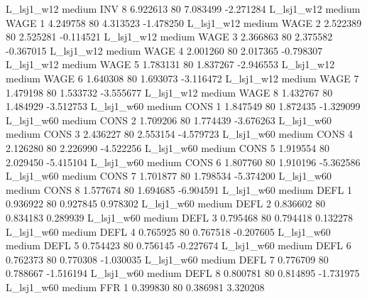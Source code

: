     L_lsj1_w12     medium      INV                 8  6.922613 80       7.083499          -2.271284
    L_lsj1_w12     medium     WAGE                 1  4.249758 80       4.313523          -1.478250
    L_lsj1_w12     medium     WAGE                 2  2.522389 80       2.525281          -0.114521
    L_lsj1_w12     medium     WAGE                 3  2.366863 80       2.375582          -0.367015
    L_lsj1_w12     medium     WAGE                 4  2.001260 80       2.017365          -0.798307
    L_lsj1_w12     medium     WAGE                 5  1.783131 80       1.837267          -2.946553
    L_lsj1_w12     medium     WAGE                 6  1.640308 80       1.693073          -3.116472
    L_lsj1_w12     medium     WAGE                 7  1.479198 80       1.533732          -3.555677
    L_lsj1_w12     medium     WAGE                 8  1.432767 80       1.484929          -3.512753
    L_lsj1_w60     medium     CONS                 1  1.847549 80       1.872435          -1.329099
    L_lsj1_w60     medium     CONS                 2  1.709206 80       1.774439          -3.676263
    L_lsj1_w60     medium     CONS                 3  2.436227 80       2.553154          -4.579723
    L_lsj1_w60     medium     CONS                 4  2.126280 80       2.226990          -4.522256
    L_lsj1_w60     medium     CONS                 5  1.919554 80       2.029450          -5.415104
    L_lsj1_w60     medium     CONS                 6  1.807760 80       1.910196          -5.362586
    L_lsj1_w60     medium     CONS                 7  1.701877 80       1.798534          -5.374200
    L_lsj1_w60     medium     CONS                 8  1.577674 80       1.694685          -6.904591
    L_lsj1_w60     medium     DEFL                 1  0.936922 80       0.927845           0.978302
    L_lsj1_w60     medium     DEFL                 2  0.836602 80       0.834183           0.289939
    L_lsj1_w60     medium     DEFL                 3  0.795468 80       0.794418           0.132278
    L_lsj1_w60     medium     DEFL                 4  0.765925 80       0.767518          -0.207605
    L_lsj1_w60     medium     DEFL                 5  0.754423 80       0.756145          -0.227674
    L_lsj1_w60     medium     DEFL                 6  0.762373 80       0.770308          -1.030035
    L_lsj1_w60     medium     DEFL                 7  0.776709 80       0.788667          -1.516194
    L_lsj1_w60     medium     DEFL                 8  0.800781 80       0.814895          -1.731975
    L_lsj1_w60     medium      FFR                 1  0.399830 80       0.386981           3.320208
